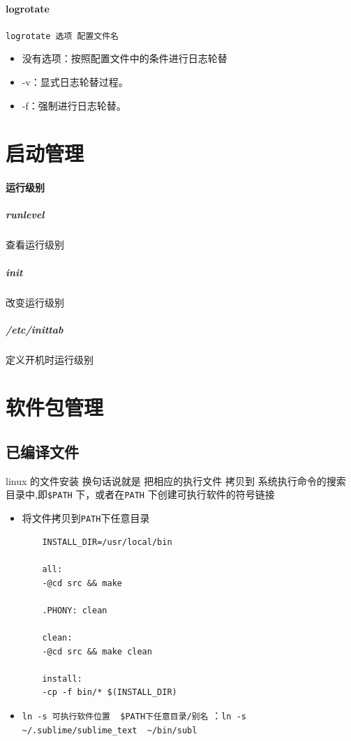 \documentclass[UTF8,a4paper,12pt]{ctexbook}
\begin{document}
			\paragraph{logrotate}\verb|logrotate 选项 配置文件名|
				\begin{itemize}
					\item 没有选项：按照配置文件中的条件进行日志轮替
					\item -v：显式日志轮替过程。
					\item -f：强制进行日志轮替。
				\end{itemize}
				
	\section{启动管理}
		\paragraph{运行级别}
			\subparagraph{runlevel}查看运行级别
	
			\subparagraph{init} 改变运行级别
			
			\subparagraph{/etc/inittab} 定义开机时运行级别
			
			
			
	\section{软件包管理}
		\subsection{已编译文件}
		linux 的文件安装 换句话说就是 把相应的执行文件 拷贝到 系统执行命令的搜索 目录中,即\verb|$PATH| 下，或者在\verb|PATH| 下创建可执行软件的符号链接
		
			\begin{itemize}
				\item 将文件拷贝到\verb|PATH|下任意目录
					\begin{lstlisting}
	INSTALL_DIR=/usr/local/bin
				
	all:
	-@cd src && make
					
	.PHONY: clean
					
	clean:
	-@cd src && make clean
					
	install:
	-cp -f bin/* $(INSTALL_DIR)
					\end{lstlisting}
				\item \verb|ln -s 可执行软件位置  $PATH下任意目录/别名|  ：\verb|ln -s ~/.sublime/sublime_text  ~/bin/subl|
			\end{itemize}
		
\end{document}
